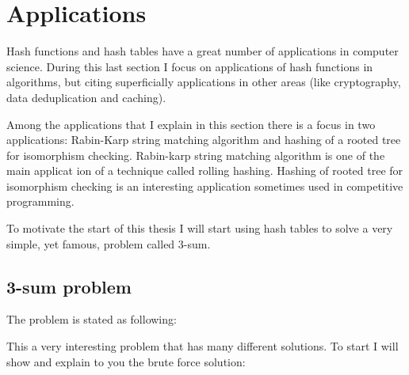 \chapter{Applications}
\label{cap:Applications}


Hash functions and hash tables have a great number of applications in computer science. During this last section I focus on applications of hash functions in algorithms, but citing superficially applications in other areas (like cryptography, data deduplication and caching).

Among the applications that I explain in this section there is a focus in two applications: Rabin-Karp string matching algorithm and hashing of a rooted tree for isomorphism checking. Rabin-karp string matching algorithm is one of the main applicat
ion of a technique called rolling hashing. Hashing of rooted tree for isomorphism checking is an interesting application sometimes used in competitive programming.

To motivate the start of this thesis I will start using hash tables to solve a very simple, yet famous, problem called 3-sum.
\section{3-sum problem}
The problem is stated as following:

\medskip


\medskip

This a very interesting problem that has many different solutions. To start I will show and explain to you the brute force solution:

